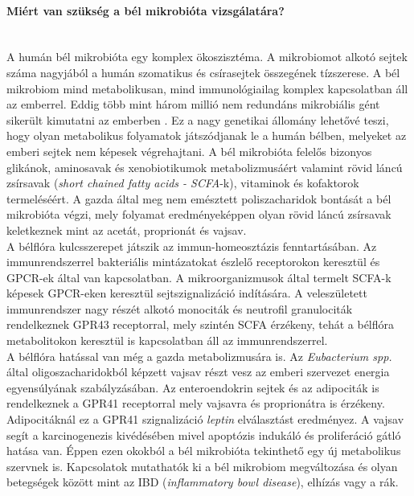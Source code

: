 \documentclass[a4paper,12pt]{article}
\begin{document}
		\paragraph{Miért van szükség a bél mikrobióta vizsgálatára?} \mbox{}\\
		A humán bél mikrobióta egy komplex ökoszisztéma. A mikrobiomot alkotó sejtek száma nagyjából a humán szomatikus és csírasejtek összegének tízszerese.  A bél mikrobiom mind metabolikusan, mind immunológiailag komplex kapcsolatban áll az emberrel.\cite{gut_microbiome} Eddig több mint három millió nem redundáns mikrobiális gént sikerült kimutatni az emberben \cite{meta_omics}. Ez a nagy genetikai állomány lehetővé teszi, hogy olyan metabolikus folyamatok játszódjanak le a humán bélben, melyeket az emberi sejtek nem képesek végrehajtani. \cite{gut_microbiome} A bél mikrobióta felelős bizonyos glikánok, aminosavak és xenobiotikumok metabolizmusáért valamint rövid láncú zsírsavak (\textit{short chained fatty acids - SCFA}-k), vitaminok és kofaktorok termeléséért. A gazda által meg nem emésztett poliszacharidok bontását a bél mikrobióta végzi, mely folyamat eredményeképpen olyan rövid láncú zsírsavak keletkeznek mint az acetát, proprionát és vajsav. \cite{scfa_and_vitamine} \\
		\indent		 A bélflóra kulcsszerepet játszik az immun-homeosztázis fenntartásában. Az immunrendszerrel bakteriális mintázatokat észlelő receptorokon keresztül és GPCR-ek által van kapcsolatban. A mikroorganizmusok által termelt SCFA-k képesek GPCR-eken keresztül sejtszignalizáció indítására. A veleszületett immunrendszer nagy részét alkotó monociták és neutrofil granulociták rendelkeznek GPR43 receptorral, mely szintén SCFA érzékeny, tehát a bélflóra metabolitokon keresztül is kapcsolatban áll az immunrendszerrel. \cite{buthyrate_immune} \\
		\indent  A bélflóra hatással van még a gazda metabolizmusára is.  Az \textit{Eubacterium spp.} által oligoszacharidokból képzett vajsav részt vesz az emberi szervezet energia egyensúlyának szabályzásában. \cite{gut_microbiome} Az enteroendokrin sejtek és az adipociták is rendelkeznek a GPR41 receptorral mely vajsavra és proprionátra is érzékeny. Adipocitáknál ez a GPR41 szignalizáció \textit{leptin} elválasztást eredményez. \cite{buthyrate_immune} A vajsav segít a karcinogenezis kivédésében mivel apoptózis indukáló és proliferáció gátló hatása van. Éppen ezen okokból a bél mikrobióta tekinthető egy új metabolikus szervnek is. \cite{host_bacterial_mutualism} Kapcsolatok mutathatók ki a bél mikrobiom megváltozása és olyan betegségek között mint az IBD (\textit{inflammatory bowl disease}), elhízás vagy a rák. \cite{gut_microbiome}
		
\end{document}
